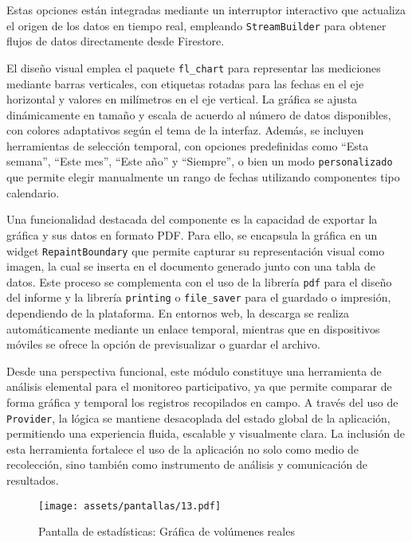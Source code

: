 Estas opciones están integradas mediante un interruptor interactivo que actualiza el origen de los datos en tiempo real, empleando \texttt{StreamBuilder} para obtener flujos de datos directamente desde Firestore.

El diseño visual emplea el paquete \texttt{fl\_chart} para representar las mediciones mediante barras verticales, con etiquetas rotadas para las fechas en el eje horizontal y valores en milímetros en el eje vertical. La gráfica se ajusta dinámicamente en tamaño y escala de acuerdo al número de datos disponibles, con colores adaptativos según el tema de la interfaz. Además, se incluyen herramientas de selección temporal, con opciones predefinidas como ``Esta semana'', ``Este mes'', ``Este año'' y ``Siempre'', o bien un modo \texttt{personalizado} que permite elegir manualmente un rango de fechas utilizando componentes tipo calendario.

Una funcionalidad destacada del componente es la capacidad de exportar la gráfica y sus datos en formato PDF. Para ello, se encapsula la gráfica en un widget \texttt{RepaintBoundary} que permite capturar su representación visual como imagen, la cual se inserta en el documento generado junto con una tabla de datos. Este proceso se complementa con el uso de la librería \texttt{pdf} para el diseño del informe y la librería \texttt{printing} o \texttt{file\_saver} para el guardado o impresión, dependiendo de la plataforma. En entornos web, la descarga se realiza automáticamente mediante un enlace temporal, mientras que en dispositivos móviles se ofrece la opción de previsualizar o guardar el archivo.

Desde una perspectiva funcional, este módulo constituye una herramienta de análisis elemental para el monitoreo participativo, ya que permite comparar de forma gráfica y temporal los registros recopilados en campo. A través del uso de \texttt{Provider}, la lógica se mantiene desacoplada del estado global de la aplicación, permitiendo una experiencia fluida, escalable y visualmente clara. La inclusión de esta herramienta fortalece el uso de la aplicación no solo como medio de recolección, sino también como instrumento de análisis y comunicación de resultados.



\begin{figure}[h!]
\centering
  \texttt{[image: assets/pantallas/13.pdf]}
  \caption{Pantalla de estadísticas: Gráfica de volúmenes reales }
  \label{pantallas13}
\end{figure}


